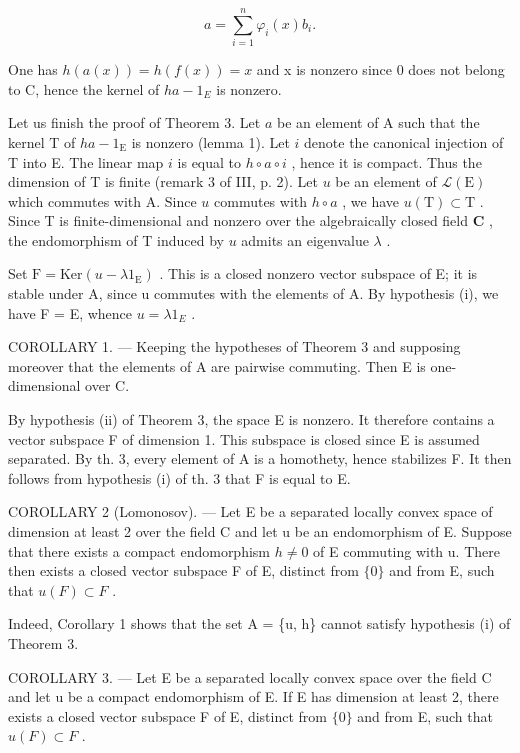 \[
a = \sum_ {i = 1} ^ {n} \varphi_ {i} (x) b _ {i}.
\]

One has \(h(a(x)) = h(f(x)) = x\) and x is nonzero since 0 does not belong to C, hence the kernel of \(ha - 1_{E}\) is nonzero.

Let us finish the proof of Theorem 3. Let \(a\) be an element of A such that the kernel T of \(ha - 1_{\mathrm{E}}\) is nonzero (lemma 1). Let \(i\) denote the canonical injection of T into E. The linear map \(i\) is equal to \(h \circ a \circ i\) , hence it is compact. Thus the dimension of T is finite (remark 3 of III, p. 2). Let \(u\) be an element of \(\mathcal{L}(\mathrm{E})\) which commutes with A. Since \(u\) commutes with \(h \circ a\) , we have \(u(\mathrm{T}) \subset \mathrm{T}\) . Since T is finite-dimensional and nonzero over the algebraically closed field \(\mathbf{C}\) , the endomorphism of T induced by \(u\) admits an eigenvalue \(\lambda\) .

Set \(\mathrm{F} = \mathrm{Ker}(u - \lambda1_{\mathrm{E}})\) . This is a closed nonzero vector subspace of E; it is stable under A, since u commutes with the elements of A. By hypothesis (i), we have F = E, whence \(u = \lambda1_{E}\) .

COROLLARY 1. --- Keeping the hypotheses of Theorem 3 and supposing moreover that the elements of A are pairwise commuting. Then E is one-dimensional over C.

By hypothesis (ii) of Theorem 3, the space E is nonzero. It therefore contains a vector subspace F of dimension 1. This subspace is closed since E is assumed separated. By th. 3, every element of A is a homothety, hence stabilizes F. It then follows from hypothesis (i) of th. 3 that F is equal to E.

COROLLARY 2 (Lomonosov). --- Let E be a separated locally convex space of dimension at least 2 over the field C and let u be an endomorphism of E. Suppose that there exists a compact endomorphism \(h \neq 0\) of E commuting with u. There then exists a closed vector subspace F of E, distinct from \(\{0\}\) and from E, such that \(u(F) \subset F\) .

Indeed, Corollary 1 shows that the set A = \{u, h\} cannot satisfy hypothesis (i) of Theorem 3.

COROLLARY 3. --- Let E be a separated locally convex space over the field C and let u be a compact endomorphism of E. If E has dimension at least 2, there exists a closed vector subspace F of E, distinct from \(\{0\}\) and from E, such that \(u(F) \subset F\) .


